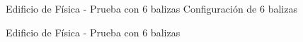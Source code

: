 \documentclass{beamer}
\begin{document}
  \begin{frame}{Edificio de Física - Prueba con 6 balizas}
    Configuración de 6 balizas
    \begin{figure}[H]
      \centering
      \def\svgwidth{0.5\linewidth}
       
      \label{fig:sensores_fisica_6}
    \end{figure}
  \end{frame}

  \begin{frame}{Edificio de Física - Prueba con 6 balizas}
    \begin{figure}[H]
      \centering
      \scalebox{0.6}{}
      \label{fig:res_fisica_6}
  \end{figure}
  \end{frame}
\end{document}
